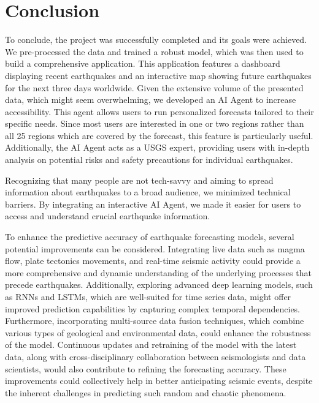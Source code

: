 \chapter{Conclusion}\label{ch:conclusion}
To conclude, the project was successfully completed and its goals were achieved. We pre-processed the data and trained a robust model, which was then used to build a comprehensive application. This application features a dashboard displaying recent earthquakes and an interactive map showing future earthquakes for the next three days worldwide. Given the extensive volume of the presented data, which might seem overwhelming, we developed an AI Agent to increase accessibility. This agent allows users to run personalized forecasts tailored to their specific needs. Since most users are interested in one or two regions rather than all 25 regions which are covered by the forecast, this feature is particularly useful. Additionally, the AI Agent acts as a \ac{USGS} expert, providing users with in-depth analysis on potential risks and safety precautions for individual earthquakes.

Recognizing that many people are not tech-savvy and aiming to spread information about earthquakes to a broad audience, we minimized technical barriers. By integrating an interactive AI Agent, we made it easier for users to access and understand crucial earthquake information.

To enhance the predictive accuracy of earthquake forecasting models, several potential improvements can be considered. Integrating live data such as magma flow, plate tectonics movements, and real-time seismic activity could provide a more comprehensive and dynamic understanding of the underlying processes that precede earthquakes. Additionally, exploring advanced deep learning models, such as \ac{RNNs} and \ac{LSTM}s, which are well-suited for time series data, might offer improved prediction capabilities by capturing complex temporal dependencies. Furthermore, incorporating multi-source data fusion techniques, which combine various types of geological and environmental data, could enhance the robustness of the model. Continuous updates and retraining of the model with the latest data, along with cross-disciplinary collaboration between seismologists and data scientists, would also contribute to refining the forecasting accuracy. These improvements could collectively help in better anticipating seismic events, despite the inherent challenges in predicting such random and chaotic phenomena.